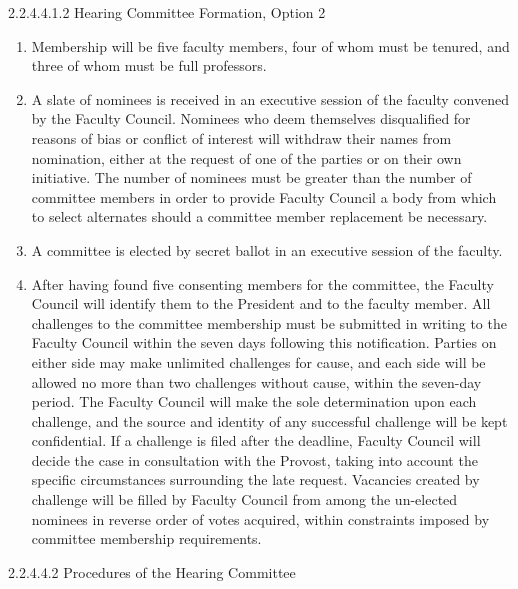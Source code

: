 \documentclass[letterpaper, 11pt]{article}
\begin{document}
				2.2.4.4.1.2 Hearing Committee Formation, Option 2
				\begin{enumerate}[label=\alph*)]
					\item{Membership will be five faculty members, four of whom must be tenured, and three of whom must be full professors.}
					\item{A slate of nominees is received in an executive session of the faculty convened by the Faculty Council.  Nominees who deem themselves disqualified for reasons of bias or conflict of interest will withdraw their names from nomination, either at the request of one of the parties or on their own initiative.  The number of nominees must be greater than the number of committee members in order to provide Faculty Council a body from which to select alternates should a committee member replacement be necessary.}
					\item{A committee is elected by secret ballot in an executive session of the faculty.}
					\item{After having found five consenting members for the committee, the Faculty Council will identify them to the President and to the faculty member.  All challenges to the committee membership must be submitted in writing to the Faculty Council within the seven days following this notification.  Parties on either side may make unlimited challenges for cause, and each side will be allowed no more than two challenges without cause, within the seven-day period.  The Faculty Council will make the sole determination upon each challenge, and the source and identity of any successful challenge will be kept confidential.  If a challenge is filed after the deadline, Faculty Council will decide the case in consultation with the Provost, taking into account the specific circumstances surrounding the late request.  Vacancies created by challenge will be filled by Faculty Council from among the un-elected nominees in reverse order of votes acquired, within constraints imposed by committee membership requirements.}
				\end{enumerate}
				2.2.4.4.2 Procedures of the Hearing Committee
\end{document}
